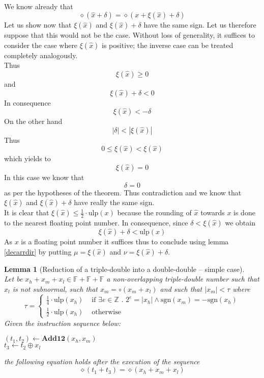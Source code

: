 \documentclass[a4paper,10pt,twoside]{article}
\newtheorem{lemma}[theorem]{Lemma}
\newenvironment{proof}[1][Proof]{\begin{trivlist}
\item[\hskip \labelsep {\bfseries #1}]}{\end{trivlist}}
\newcommand{\qed}{\nobreak \ifvmode \relax \else \ifdim \lastskip<1.5em \hskip-\lastskip
\hskip1.5em plus0em minus0.5em \fi \nobreak \vrule height0.75em width0.5em depth0.25em\fi}
\newcommand{\Z}{\ensuremath{\mathbb {Z}}}
\newcommand{\F}{\ensuremath{\mathbb {F}}}
\newcommand{\hi}{\ensuremath{\mathit{h}}}
\newcommand{\mi}{\ensuremath{\mathit{m}}}
\newcommand{\lo}{\ensuremath{\mathit{l}}}
\newcommand{\mAdd}{\ensuremath{\mathbf{Add12}}}
\newcommand{\mUlp}{\ensuremath{\mathrm{ulp}}}
\newcommand{\sgn}{\ensuremath{\mathrm{sgn}}}
\begin{document}
\begin{proof} ~ \\
We know already that 
$$\diamond \left( \hat{x} + \delta \right) = \diamond \left( x + \xi\left( \hat{x} \right) + \delta \right)$$
Let us show now that $\xi\left( \hat{x} \right)$ and $\xi\left( \hat{x} \right) + \delta$ have the same sign. 
Let us therefore suppose that this would not be the case.  
Without loss of generality, it suffices to consider the case where $\xi\left( \hat{x} \right)$ is positive; the 
inverse case can be treated completely analogously. \\
Thus $$\xi\left( \hat{x} \right) \geq 0$$ and $$\xi\left( \hat{x} \right) + \delta < 0$$
In consequence $$\xi\left( \hat{x} \right) < - \delta$$
On the other hand $$\left \vert \delta \right \vert < \left \vert \xi\left( \hat{x} \right) \right \vert$$
Thus
$$0 \leq \xi\left( \hat{x} \right) < \xi\left( \hat{x} \right)$$
which yields to 
$$\xi\left( \hat{x} \right) = 0$$ 
In this case we know that $$\delta = 0$$ as per the hypotheses of the theorem. Thus contradiction and we know that 
$\xi\left( \hat{x} \right)$ and $\xi\left( \hat{x} \right) + \delta$ have really the same sign.\\
It is clear that $\xi\left( \hat{x} \right) \leq \frac{1}{2} \cdot \mUlp\left( x \right)$ because the rounding of $\hat{x}$ 
towards $x$ is done to the nearest floating point number. In consequence, since $\delta < \xi\left( \hat{x} \right)$ we obtain
$$\xi\left( \hat{x} \right) + \delta < \mUlp\left( x \right)$$
As $x$ is a floating point number it suffices thus to conclude using lemma \ref{decarrdir} 
by putting $\mu = \xi\left( \hat{x} \right)$ and
$\nu = \xi\left( \hat{x} \right) + \delta$.\qed
\end{proof}
\begin{lemma}[Reduction of a triple-double into a double-double -- simple case] \label{moinsquunmiulp} ~ \\
Let be $x_\hi + x_\mi + x_\lo \in \F + \F + \F$ a non-overlapping triple-double number such that $x_\lo$ is not subnormal, such that 
$x_\mi = \circ \left( x_\mi + x_\lo \right)$ and such that $\left \vert x_\mi \right \vert < \tau$ where
$$\tau = \left \lbrace \begin{array}{ll} 
\frac{1}{4} \cdot \mUlp\left( x_\hi \right) & \mbox{ if } \exists e \in \Z \mbox{ . } 2^e = \left \vert x_\hi \right \vert \land 
\sgn\left( x_\mi \right) = -\sgn\left( x_\hi \right)\\
\frac{1}{2} \cdot \mUlp\left( x_\hi \right) & \mbox{ otherwise} \end{array} \right.$$
Given the instruction sequence below:
\begin{center}
\begin{minipage}[b]{50mm}
$\left( t_1, t_2 \right) \gets \mAdd\left( x_\hi, x_\mi \right)$ \\
$t_3 \gets t_2 \oplus x_\lo$
\end{minipage}
\end{center}
the following equation holds after the execution of the sequence
$$\diamond\left( t_1 + t_3 \right) = \diamond\left( x_\hi + x_\mi + x_\lo \right)$$
\end{lemma}
\end{document}
